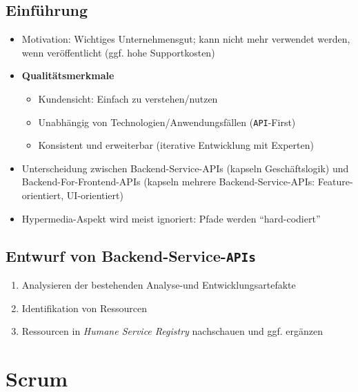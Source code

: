 \subsection{Einführung}
\begin{itemize}
	\item Motivation: Wichtiges Unternehmensgut; kann nicht mehr verwendet werden, wenn veröffentlicht (ggf. hohe Supportkosten)
	\item \textbf{Qualitätsmerkmale}
	\begin{itemize}
		\item Kundensicht: Einfach zu verstehen/nutzen
		\item Unabhängig von Technologien/Anwendungsfällen (\texttt{API}-First)
		\item Konsistent und erweiterbar (iterative Entwicklung mit Experten)
	\end{itemize}
	\item Unterscheidung zwischen Backend-Service-APIs (kapseln Geschäftslogik) und Backend-For-Frontend-APIs (kapseln mehrere Backend-Service-APIs: Feature-orientiert, UI-orientiert)
	\item Hypermedia-Aspekt wird meist ignoriert: Pfade werden "`hard-codiert"'
\end{itemize}

\subsection{Entwurf von Backend-Service-\texttt{APIs}}
\begin{enumerate}
	\item Analysieren der bestehenden Analyse-und Entwicklungsartefakte
	\item Identifikation von Ressourcen
	\item Ressourcen in \textit{Humane Service Registry} nachschauen und ggf. ergänzen
\end{enumerate}



\section{Scrum}

